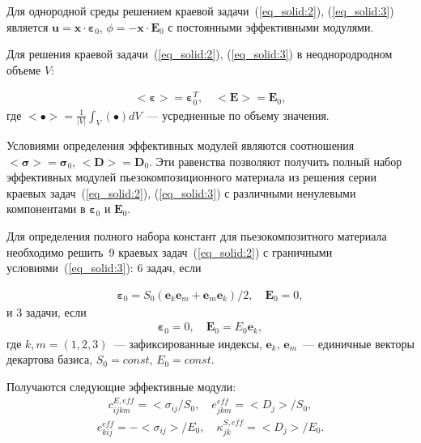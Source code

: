 Для однородной среды решением краевой задачи~(\ref{eq_solid:2}), (\ref{eq_solid:3}) является $\boldsymbol{u}=\boldsymbol{x} \cdot \boldsymbol{\varepsilon}_0$, $\phi=-\boldsymbol{x} \cdot \boldsymbol{E}_0$ с постоянными эффективными модулями.

Для решения краевой задачи~(\ref{eq_solid:2}), (\ref{eq_solid:3}) в неоднородродном объеме $V$:

\begin{equation}\label{eq2:1} 
	\begin{aligned}
	<\boldsymbol{\varepsilon}>=\boldsymbol{\varepsilon}_0^T, \quad <\boldsymbol{E}>=\boldsymbol{E}_0,
\end{aligned} 
\end{equation}
где $<\bullet>=\frac1{|V|}\int_V(\bullet)dV$~--- усредненные по объему значения.

Условиями определения эффективных модулей являются соотношения $<\boldsymbol{\sigma}>=\boldsymbol{\sigma}_0$, $<\boldsymbol{D}>=\boldsymbol{D}_0$. Эти равенства позволяют получить полный набор эффективных модулей пьезокомпозиционного материала из решения серии краевых задач~(\ref{eq_solid:2}), (\ref{eq_solid:3}) с различными ненулевыми компонентами в $\boldsymbol{\varepsilon}_0$ и $\boldsymbol{E}_0$.

Для определения полного набора констант для пьезокомпозитного материала необходимо решить~9 краевых задач~(\ref{eq_solid:2}) с граничными условиями~(\ref{eq_solid:3}): 6 задач, если 

\[
\begin{aligned}
\boldsymbol{\varepsilon}_0=S_0(\boldsymbol e_k \boldsymbol e_m+ \boldsymbol e_m \boldsymbol e_k)/2, \quad \boldsymbol{E}_0=0,
\end{aligned} 
\]
и 3 задачи, если
\[
\begin{aligned}
\boldsymbol{\varepsilon}_0=0, \quad \boldsymbol{E}_0=E_0\boldsymbol e_k,
\end{aligned} 
\]
где $k,m=(1,2,3)$~--- зафиксированные индексы, $\boldsymbol e_k$, $\boldsymbol e_m$~--- единичные векторы декартова базиса, $S_0=const$, $E_0=const$.

Получаются следующие эффективные модули:
\[
\begin{aligned}
c_{ijkm}^{E,eff}=<\sigma_{ij}/S_0, \quad
e_{jkm}^{eff}=<D_j>/S_0,
\end{aligned} 
\]
\[
\begin{aligned}
e_{kij}^{eff}=-<\sigma_{ij}>/E_0, \quad
\kappa_{jk}^{S,eff}=<D_j>/E_0.
\end{aligned} 
\]

